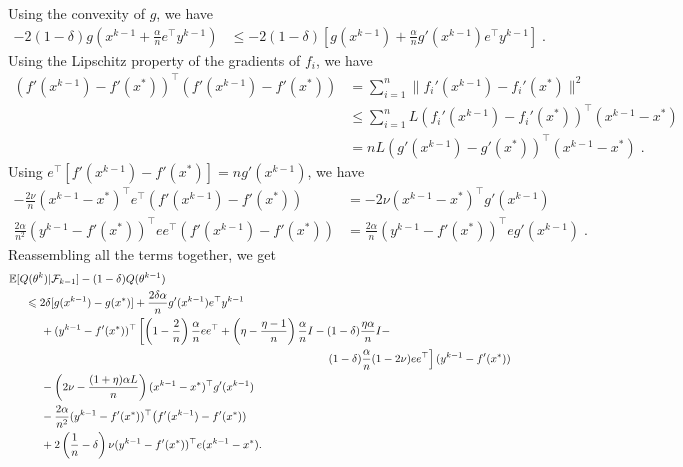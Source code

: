 \documentclass{article}
\newcommand{\idm}{I}
\def\E{_{\scriptscriptstyle E}}
\def \E{{\mathbb E}}
\def \E{{\mathbb E}}
\begin{document}
Using the convexity of $g$, we have
\begin{align*}
- 2 ( 1 - \delta) g \left(x^{k-1} + \frac{\alpha}{n} e^\top y^{k-1} \right) &\leqslant - 2 ( 1 - \delta) \left[ g(x^{k-1}) + \frac{\alpha}{n} g'(x^{k-1}) e^\top y^{k-1}
\right] \; .
\end{align*}
Using the Lipschitz property of the gradients of $f_i$, we have
\begin{align*}
( f'(x^{k-1}) - f'(x^\ast))^\top ( f'(x^{k-1}) - f'(x^\ast))
& = \sum_{i=1}^n \| f_i'(x^{k-1}) - f_i'(x^{\ast})\|^2 \\
&
\leqslant  \sum_{i=1}^n L ( f_i'(x^{k-1}) - f_i'(x^{\ast}))^\top( x^{k-1} - x^{\ast})
\\
& = nL ( g'(x^{k-1}) - g'(x^{\ast}))^\top( x^{k-1} - x^{\ast}) \; .
\end{align*}
Using $e^\top [ f'(x^{k-1}) - f'(x^\ast)] = ng'(x^{k-1})$, we have
\begin{align*}
-\frac{2 \nu}{n} (x^{k-1} -x^\ast)^\top e ^\top ( f'(x^{k-1}) - f'(x^\ast)) & = -2 \nu (x^{k-1} -x^\ast)^\top g'(x^{k-1})\\
\frac{2\alpha}{n^2} (y^{k-1} - f'(x^\ast))^\top ee^\top ( f'(x^{k-1}) - f'(x^\ast))&= \frac{2\alpha}{n} (y^{k-1} - f'(x^\ast))^\top e g'(x^{k-1}) \; .
\end{align*}
Reassembling all the terms together, we get
\begin{align*}
& \E [ Q(\theta^k) | \mathcal{F}_{k-1} ] - ( 1 - \delta) Q(\theta^{k-1}) \\
& \hspace*{.5cm}\leqslant
2 \delta[g (x^{k-1}) - g(x^\ast) ] + \frac{2\delta\alpha}{n} g'(x^{k-1}) e^\top y^{k-1}\\
&\hspace*{1cm} + (y^{k-1} - f'(x^\ast))^\top
\left[
\left(1-\frac{2}{n}\right) \frac{\alpha}{n} ee^\top + \left(\eta - \frac{\eta-1}{n}\right) \frac{\alpha}{n} \idm
- (1-\delta) \frac{\eta \alpha}{n} \idm - \right. \\
& \hspace*{10cm} \left. (1-\delta) \frac{\alpha}{n} (1 - 2 \nu )ee^\top
\right] (y^{k-1} - f'(x^\ast)) \\
&\hspace*{1cm} - \left( 2 \nu - \frac{(1+\eta) \alpha L}{n}\right)(x^{k-1} -x^\ast)^\top g'(x^{k-1}) \\
&\hspace*{1cm} - \frac{2\alpha}{n^2} (y^{k-1} - f'(x^\ast))^\top \big  ( f'(x^{k-1}) - f'(x^\ast)) \\
&\hspace*{1cm} + 2 \left(\frac{1}{n}-\delta\right) \nu (y^{k-1} - f'(x^\ast))^\top e (x^{k-1} -x^\ast).
\end{align*}
\end{document}
